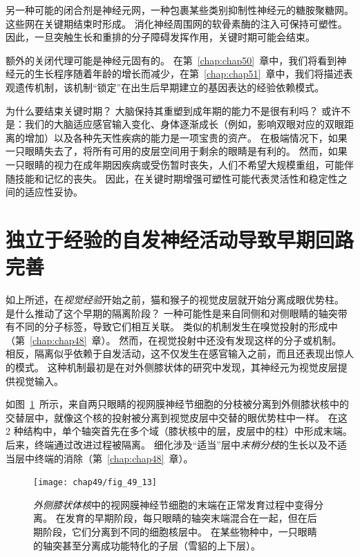 另一种可能的闭合剂是神经元网，一种包裹某些类别抑制性神经元的糖胺聚糖网。
这些网在关键期结束时形成。
消化神经周围网的软骨素酶的注入可保持可塑性。
因此，一旦突触生长和重排的分子障碍发挥作用，关键时期可能会结束。


额外的关闭代理可能是神经元固有的。
在第~\ref{chap:chap50}~章中，我们将看到神经元的生长程序随着年龄的增长而减少，在第~\ref{chap:chap51}~章中，我们将描述表观遗传机制，该机制“锁定”在出生后早期建立的基因表达的经验依赖模式。


为什么要结束关键时期？
大脑保持其重塑到成年期的能力不是很有利吗？
或许不是：我们的大脑适应感官输入变化、身体逐渐成长（例如，影响双眼对应的双眼距离的增加）以及各种先天性疾病的能力是一项宝贵的资产。
在极端情况下，如果一只眼睛失去了，将所有可用的皮层空间用于剩余的眼睛是有利的。
然而，如果一只眼睛的视力在成年期因疾病或受伤暂时丧失，人们不希望大规模重组，可能伴随技能和记忆的丧失。
因此，在关键时期增强可塑性可能代表灵活性和稳定性之间的适应性妥协。



\section{独立于经验的自发神经活动导致早期回路完善}

如上所述，在\textit{视觉经验}开始之前，猫和猴子的视觉皮层就开始分离成眼优势柱。
是什么推动了这个早期的隔离阶段？
一种可能性是来自同侧和对侧眼睛的轴突带有不同的分子标签，导致它们相互关联。
类似的机制发生在嗅觉投射的形成中（第~\ref{chap:chap48}~章）。
然而，在视觉投射中还没有发现这样的分子或机制。
相反，隔离似乎依赖于自发活动，这不仅发生在感官输入之前，而且还表现出惊人的模式。
这种机制最初是在对外侧膝状体的研究中发现，其神经元为视觉皮层提供视觉输入。


如图~\ref{fig:49_13}~所示，来自两只眼睛的视网膜神经节细胞的分枝被分离到外侧膝状核中的交替层中，就像这个核的投射被分离到视觉皮层中交替的眼优势柱中一样。
在这 2 种结构中，单个轴突首先在多个域（膝状核中的层，皮层中的柱）中形成末端。
后来，终端通过改进过程被隔离。
细化涉及“适当”层中\textit{末梢分枝}的生长以及不适当层中终端的消除（第~\ref{chap:chap48}~章）。


\begin{figure}[htbp]
	\centering
	\texttt{[image: chap49/fig\_49\_13]}
	\caption{\textit{外侧膝状体核}中的视网膜神经节细胞的末端在正常发育过程中变得分离。
		在发育的早期阶段，每只眼睛的轴突末端混合在一起，但在后期阶段，它们分离到不同的细胞核层中。
		在某些物种中，一只眼睛的轴突甚至分离成功能特化的子层（雪貂的上下层）\cite{sanes1999formation}。}
	\label{fig:49_13}
\end{figure}



